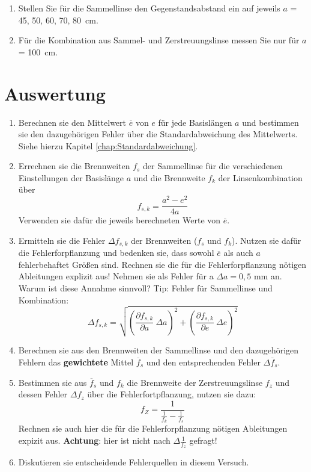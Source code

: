 \begin{enumerate}
 \item Stellen Sie für die Sammellinse den Gegenstandsabstand ein auf jeweils $a$ = 45, 50, 60, 70, 80~cm.
 \item Für die Kombination aus Sammel- und Zerstreuungslinse messen Sie nur für $a$ = 100~cm.
\end{enumerate}

\section{Auswertung} 

\begin{enumerate}
%
\item Berechnen sie den Mittelwert $\overline{e}$ von $e$ für jede Basislängen $a$ und bestimmen sie den dazugehörigen Fehler über die Standardabweichung des Mittelwerts. Siehe hierzu Kapitel \ref{chap:Standardabweichung}.
%
\item Errechnen sie die Brennweiten $f_s$ der Sammellinse für die verschiedenen Einstellungen der Basislänge $a$ und die Brennweite $f_k$ der Linsenkombination über 
\begin{equation*}
f_{s,k} = \frac{a^2-e^2}{4 a}
\end{equation*}
Verwenden sie dafür die jeweils berechneten Werte von $\overline{e}$.
%
\item Ermitteln sie die Fehler $\Delta f_{s,k}$ der Brennweiten ($f_s$ und $f_k$). Nutzen sie dafür die Fehlerforpflanzung und bedenken sie, dass sowohl $\overline{e}$ als auch $a$ fehlerbehaftet Größen sind. Rechnen sie die für die Fehlerforpflanzung nötigen Ableitungen explizit aus! Nehmen sie als Fehler für a $\Delta a = 0,5$ mm an. Warum ist diese Annahme sinnvoll?
Tip: Fehler für Sammellinse und Kombination:
\begin{equation*}\Delta f_{s,k}=\sqrt{\left(\frac{\partial f_{s,k}}{\partial a} ~ \Delta a\right)^2 + \left(\frac{\partial f_{s,k}}{\partial e} ~ \Delta e\right)^2}
\end{equation*}
%
\item Berechnen sie aus den Brennweiten der Sammellinse und den dazugehörigen Fehlern das \textbf{gewichtete} Mittel $\overline{f}_s$ und den entsprechenden Fehler $\Delta \overline{f}_s$.
%
\item Bestimmen sie aus $\overline{f}_s$ und $f_k$ die Brennweite der Zerstreuungslinse $f_z$ und dessen Fehler $\Delta f_z$ über die Fehlerfortpflanzung, nutzen sie dazu:
\begin{equation*}
f_Z = \frac{1}{\frac{1}{f_k} - \frac{1}{f_s}}
\end{equation*}
Rechnen sie auch hier die für die Fehlerforpflanzung nötigen Ableitungen expizit aus.
\textbf{Achtung}: hier ist nicht nach $\Delta \frac{1}{f_z}$ gefragt!
%
\item Diskutieren sie entscheidende Fehlerquellen in diesem Versuch.
%
\end{enumerate}